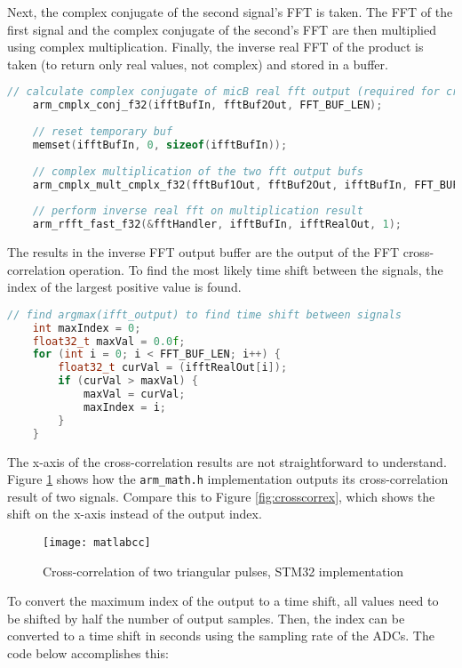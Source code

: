 \documentclass[12pt,a4paper]{report}
\begin{document}
Next, the complex conjugate of the second signal’s FFT is taken. The FFT of the first signal and the complex conjugate of the second’s FFT are then multiplied using complex multiplication. Finally, the inverse real FFT of the product is taken (to return only real values, not complex) and stored in a buffer.

\begin{lstlisting}[language=C++]
	// calculate complex conjugate of micB real fft output (required for cross-correlation)
	arm_cmplx_conj_f32(ifftBufIn, fftBuf2Out, FFT_BUF_LEN);
	
	// reset temporary buf
	memset(ifftBufIn, 0, sizeof(ifftBufIn));
	
	// complex multiplication of the two fft output bufs
	arm_cmplx_mult_cmplx_f32(fftBuf1Out, fftBuf2Out, ifftBufIn, FFT_BUF_LEN);
	
	// perform inverse real fft on multiplication result
	arm_rfft_fast_f32(&fftHandler, ifftBufIn, ifftRealOut, 1);
\end{lstlisting}

The results in the inverse FFT output buffer are the output of the FFT cross-correlation operation. To find the most likely time shift between the signals, the index of the largest positive value is found.

\begin{lstlisting}[language=C++]
	// find argmax(ifft_output) to find time shift between signals
	int maxIndex = 0;
	float32_t maxVal = 0.0f;
	for (int i = 0; i < FFT_BUF_LEN; i++) {
		float32_t curVal = (ifftRealOut[i]);
		if (curVal > maxVal) {
			maxVal = curVal;
			maxIndex = i;
		}
	}
\end{lstlisting}

The x-axis of the cross-correlation results are not straightforward to understand. Figure \ref{fig:matlabcc} shows how the \verb|arm_math.h| implementation outputs its cross-correlation result of two signals. Compare this to Figure \ref{fig:crosscorrex}, which shows the shift on the x-axis instead of the output index.

\begin{figure}[htbp]
	\centering
	\texttt{[image: matlabcc]}
	\caption{Cross-correlation of two triangular pulses, STM32 implementation}
	\label{fig:matlabcc}
\end{figure}

To convert the maximum index of the output to a time shift, all values need to be shifted by half the number of output samples. Then, the index can be converted to a time shift in seconds using the sampling rate of the ADCs. The code below accomplishes this:
\end{document}
